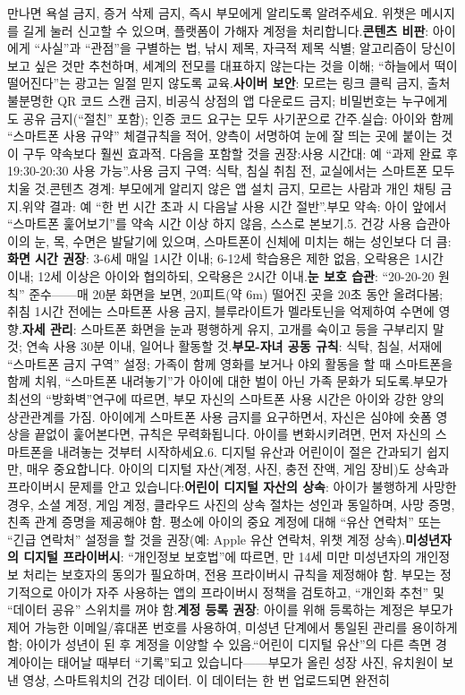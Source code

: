 만나면 욕설 금지, 증거 삭제 금지, 즉시 부모에게 알리도록 알려주세요. 위챗은 메시지를 길게 눌러 신고할 수 있으며, 플랫폼이 가해자 계정을 처리합니다.\textbf{콘텐츠 비판}: 아이에게 “사실”과 “관점”을 구별하는 법, 낚시 제목, 자극적 제목 식별; 알고리즘이 당신이 보고 싶은 것만 추천하며, 세계의 전모를 대표하지 않는다는 것을 이해; “하늘에서 떡이 떨어진다”는 광고는 일절 믿지 않도록 교육.\textbf{사이버 보안}: 모르는 링크 클릭 금지, 출처 불분명한 QR 코드 스캔 금지, 비공식 상점의 앱 다운로드 금지; 비밀번호는 누구에게도 공유 금지(“절친” 포함); 인증 코드 요구는 모두 사기꾼으로 간주.실습: 아이와 함께 “스마트폰 사용 규약” 체결규칙을 적어, 양측이 서명하여 눈에 잘 띄는 곳에 붙이는 것이 구두 약속보다 훨씬 효과적. 다음을 포함할 것을 권장:사용 시간대: 예 “과제 완료 후 19:30-20:30 사용 가능”.사용 금지 구역: 식탁, 침실 취침 전, 교실에서는 스마트폰 모두 치울 것.콘텐츠 경계: 부모에게 알리지 않은 앱 설치 금지, 모르는 사람과 개인 채팅 금지.위약 결과: 예 “한 번 시간 초과 시 다음날 사용 시간 절반”.부모 약속: 아이 앞에서 “스마트폰 훑어보기”를 약속 시간 이상 하지 않음, 스스로 본보기.5. 건강 사용 습관아이의 눈, 목, 수면은 발달기에 있으며, 스마트폰이 신체에 미치는 해는 성인보다 더 큼:\textbf{화면 시간 권장}: 3-6세 매일 1시간 이내; 6-12세 학습용은 제한 없음, 오락용은 1시간 이내; 12세 이상은 아이와 협의하되, 오락용은 2시간 이내.\textbf{눈 보호 습관}: “20-20-20 원칙” 준수——매 20분 화면을 보면, 20피트(약 6m) 떨어진 곳을 20초 동안 올려다봄; 취침 1시간 전에는 스마트폰 사용 금지, 블루라이트가 멜라토닌을 억제하여 수면에 영향.\textbf{자세 관리}: 스마트폰 화면을 눈과 평행하게 유지, 고개를 숙이고 등을 구부리지 말 것; 연속 사용 30분 이내, 일어나 활동할 것.\textbf{부모-자녀 공동 규칙}: 식탁, 침실, 서재에 “스마트폰 금지 구역” 설정; 가족이 함께 영화를 보거나 야외 활동을 할 때 스마트폰을 함께 치워, “스마트폰 내려놓기”가 아이에 대한 벌이 아닌 가족 문화가 되도록.부모가 최선의 “방화벽”연구에 따르면, 부모 자신의 스마트폰 사용 시간은 아이와 강한 양의 상관관계를 가짐. 아이에게 스마트폰 사용 금지를 요구하면서, 자신은 심야에 숏폼 영상을 끝없이 훑어본다면, 규칙은 무력화됩니다. 아이를 변화시키려면, 먼저 자신의 스마트폰을 내려놓는 것부터 시작하세요.6. 디지털 유산과 어린이이 절은 간과되기 쉽지만, 매우 중요합니다. 아이의 디지털 자산(계정, 사진, 충전 잔액, 게임 장비)도 상속과 프라이버시 문제를 안고 있습니다:\textbf{어린이 디지털 자산의 상속}: 아이가 불행하게 사망한 경우, 소셜 계정, 게임 계정, 클라우드 사진의 상속 절차는 성인과 동일하며, 사망 증명, 친족 관계 증명을 제공해야 함. 평소에 아이의 중요 계정에 대해 “유산 연락처” 또는 “긴급 연락처” 설정을 할 것을 권장(예: Apple 유산 연락처, 위챗 계정 상속).\textbf{미성년자의 디지털 프라이버시}: “개인정보 보호법”에 따르면, 만 14세 미만 미성년자의 개인정보 처리는 보호자의 동의가 필요하며, 전용 프라이버시 규칙을 제정해야 함. 부모는 정기적으로 아이가 자주 사용하는 앱의 프라이버시 정책을 검토하고, “개인화 추천” 및 “데이터 공유” 스위치를 꺼야 함.\textbf{계정 등록 권장}: 아이를 위해 등록하는 계정은 부모가 제어 가능한 이메일/휴대폰 번호를 사용하여, 미성년 단계에서 통일된 관리를 용이하게 함; 아이가 성년이 된 후 계정을 이양할 수 있음.“어린이 디지털 유산”의 다른 측면 경계아이는 태어날 때부터 “기록”되고 있습니다——부모가 올린 성장 사진, 유치원이 보낸 영상, 스마트워치의 건강 데이터. 이 데이터는 한 번 업로드되면 완전히 